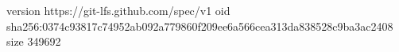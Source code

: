 version https://git-lfs.github.com/spec/v1
oid sha256:0374c93817c74952ab092a779860f209ee6a566cea313da838528c9ba3ac2408
size 349692
